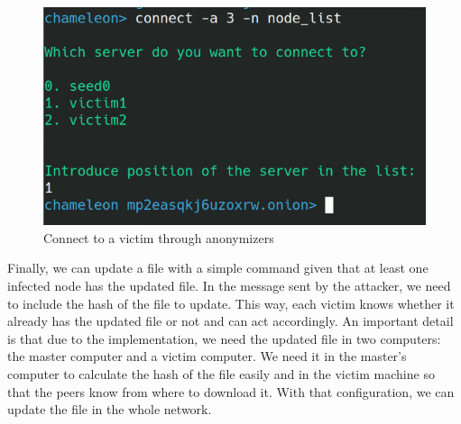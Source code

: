 \documentclass[11pt, a4paper,twoside]{tesi_upf}
\begin{document}
\begin{figure}[H]
\centering
\includegraphics[width=\linewidth]{images/anonymizers-number.png}
    \caption{Connect to a victim through anonymizers}
    \label{fig:victim-command}
\end{figure}

Finally, we can update a file with a simple command given that at least one infected node has the updated file. In the message sent by the attacker, we need to include the hash of the file to update. This way, each victim knows whether it already has the updated file or not and can act accordingly. An important detail is that due to the implementation, we need the updated file in two computers: the master computer and a victim computer. We need it in the master's computer to calculate the hash of the file easily and in the victim machine so that the peers know from where to download it. With that configuration, we can update the file in the whole network.
\end{document}
